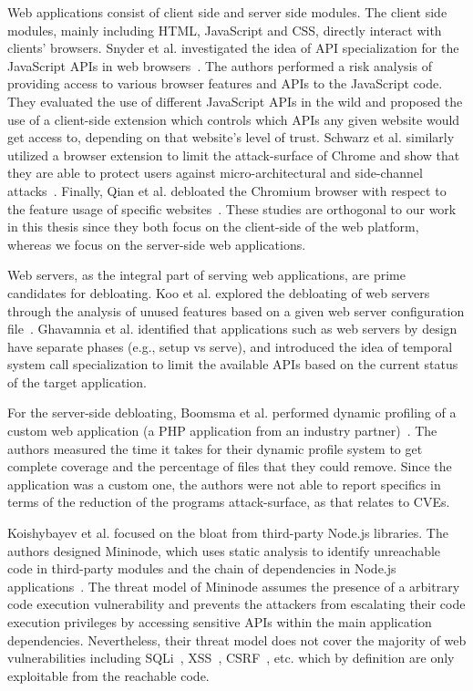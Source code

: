 Web applications consist of client side and server side modules. 
The client side modules, mainly including HTML, JavaScript and CSS, directly interact with clients' browsers. 
Snyder et al. investigated the idea of API specialization for the JavaScript APIs in web browsers~\cite{snyder2017vibrate}. 
The authors performed a risk analysis of providing access to various browser features and APIs to the JavaScript code.
They evaluated the use of different
JavaScript APIs in the wild and proposed the use of a client-side extension
which controls which APIs any given website would get access to, depending
on that website's level of trust. 
Schwarz et al. similarly utilized a browser
extension to limit the attack-surface of Chrome and show that they are able
to protect users against micro-architectural and side-channel
attacks~\cite{Schwarz2018}. 
Finally, Qian et al. debloated the Chromium browser with respect to the feature usage of specific websites~\cite{qian2020slimium}. 
These studies are orthogonal to our work in this thesis since
they both focus on the client-side of the web platform, whereas we focus on
the server-side web applications.

Web servers, as the integral part of serving web applications, are prime candidates for debloating. 
Koo et al. explored the debloating of web servers through the analysis of unused features based on a given web server configuration file~\cite{koo2019configuration}. 
Ghavamnia et al. identified that applications such as web servers by design have separate phases (e.g., setup vs serve), and introduced the idea of temporal system call specialization to limit the available APIs based on the current status of the target application. 

For the server-side debloating, Boomsma et al. performed dynamic profiling of a custom web application (a PHP application from an industry partner)~\cite{boomsma2012Dead}. 
The authors measured the time it takes for their dynamic profile system to get
complete coverage and the percentage of files that they could remove. Since the
application was a custom one, the authors were not able to report specifics
in terms of the reduction of the programs attack-surface, as that relates
to CVEs. 

Koishybayev et al. focused on the bloat from third-party Node.js libraries. 
The authors designed Mininode, which uses static analysis to identify unreachable code in third-party modules and the chain of dependencies in Node.js applications~\cite{mininode}. 
The threat model of Mininode assumes the presence of a arbitrary code execution vulnerability and prevents the attackers from escalating their code execution privileges by accessing sensitive APIs within the main application dependencies. 
Nevertheless, their threat model does not cover the majority of web vulnerabilities including SQLi~\cite{sqlInjection}, XSS~\cite{xss}, CSRF~\cite{csrf}, etc. which by definition are only exploitable from the reachable code. 

